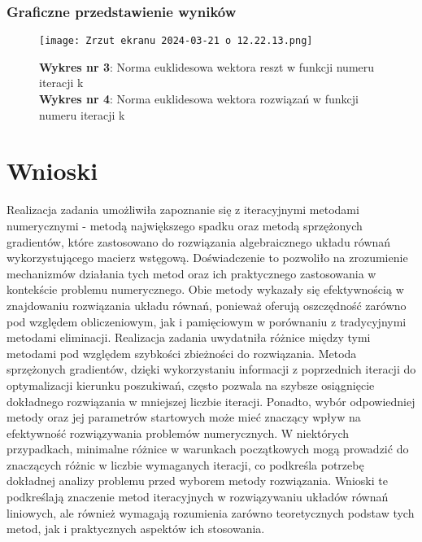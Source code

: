 \documentclass{article}
\begin{document}
\subsubsection{Graficzne przedstawienie wyników}
\begin{figure}[H]
    \centering
    \texttt{[image: Zrzut ekranu 2024-03-21 o 12.22.13.png]}
    \begin{center}
        \textbf{Wykres nr 3}: Norma euklidesowa wektora reszt w funkcji numeru iteracji k\\
        \textbf{Wykres nr 4}: Norma euklidesowa wektora rozwiązań w funkcji numeru iteracji k
    \end{center}
    \label{fig:enter-label}
\end{figure}
\section{Wnioski}
Realizacja zadania umożliwiła zapoznanie się z iteracyjnymi metodami numerycznymi - metodą największego spadku oraz metodą sprzężonych gradientów, które zastosowano do rozwiązania algebraicznego układu równań wykorzystującego macierz wstęgową. Doświadczenie to pozwoliło na zrozumienie mechanizmów działania tych metod oraz ich praktycznego zastosowania w kontekście problemu numerycznego. 
\noindent
Obie metody wykazały się efektywnością w znajdowaniu rozwiązania układu równań, ponieważ oferują oszczędność zarówno pod względem obliczeniowym, jak i pamięciowym w porównaniu z tradycyjnymi metodami eliminacji.
\noindent
Realizacja zadania uwydatniła różnice między tymi metodami pod względem szybkości zbieżności do rozwiązania. Metoda sprzężonych gradientów, dzięki wykorzystaniu informacji z poprzednich iteracji do optymalizacji kierunku poszukiwań, często pozwala na szybsze osiągnięcie dokładnego rozwiązania w mniejszej liczbie iteracji.
\noindent
Ponadto, wybór odpowiedniej metody oraz jej parametrów startowych może mieć znaczący wpływ na efektywność rozwiązywania problemów numerycznych. W niektórych przypadkach, minimalne różnice w warunkach początkowych mogą prowadzić do znaczących różnic w liczbie wymaganych iteracji, co podkreśla potrzebę dokładnej analizy problemu przed wyborem metody rozwiązania.
\noindent
Wnioski te podkreślają znaczenie metod iteracyjnych w rozwiązywaniu układów równań liniowych, ale również wymagają rozumienia zarówno teoretycznych podstaw tych metod, jak i praktycznych aspektów ich stosowania.
\end{document}
